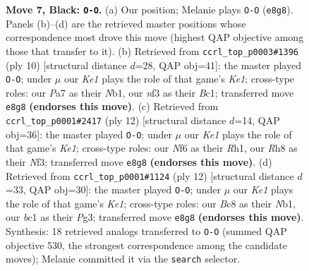 \documentclass[11pt]{article}
\begin{document}
\begin{figure}[p]
\caption{\textbf{Move 7, Black: \texttt{O-O}.} (a) Our position; Melanie plays \texttt{O-O} (\texttt{e8g8}). Panels (b)--(d) are the retrieved master positions whose correspondence most drove this move (highest QAP objective among those that transfer to it). (b) Retrieved from \texttt{ccrl\_top\_p0003\#1396} (ply 10) [structural distance $d$=28, QAP obj=41]: the master played \texttt{O-O}; under $\mu$ our \emph{Ke1} plays the role of that game's \emph{Ke1}; cross-type roles: our \emph{P}a7 as their \emph{N}b1, our \emph{n}f3 as their \emph{B}c1; transferred move \texttt{e8g8} \textbf{(endorses this move)}. (c) Retrieved from \texttt{ccrl\_top\_p0001\#2417} (ply 12) [structural distance $d$=14, QAP obj=36]: the master played \texttt{O-O}; under $\mu$ our \emph{Ke1} plays the role of that game's \emph{Ke1}; cross-type roles: our \emph{N}f6 as their \emph{R}h1, our \emph{R}h8 as their \emph{N}f3; transferred move \texttt{e8g8} \textbf{(endorses this move)}. (d) Retrieved from \texttt{ccrl\_top\_p0001\#1124} (ply 12) [structural distance $d$=33, QAP obj=30]: the master played \texttt{O-O}; under $\mu$ our \emph{Ke1} plays the role of that game's \emph{Ke1}; cross-type roles: our \emph{B}c8 as their \emph{N}b1, our \emph{b}c1 as their \emph{P}g3; transferred move \texttt{e8g8} \textbf{(endorses this move)}. Synthesis: 18 retrieved analogs transferred to \texttt{O-O} (summed QAP objective 530, the strongest correspondence among the candidate moves); Melanie committed it via the \texttt{search} selector.}
\label{fig:thought-m13}
\end{figure}

\clearpage
\end{document}
